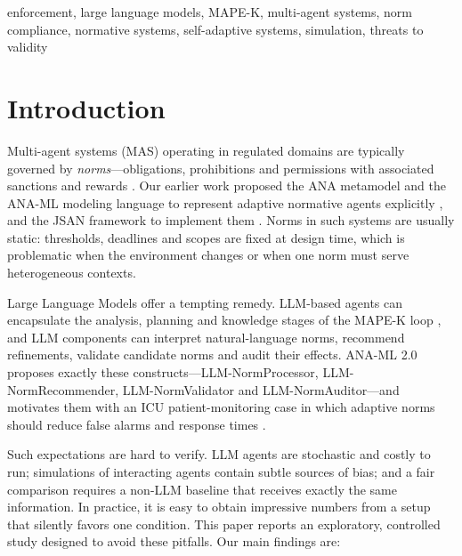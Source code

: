\documentclass{ieeeaccess}
\begin{document}
\begin{keywords}
enforcement, large language models, MAPE-K, multi-agent systems, norm compliance, normative systems, self-adaptive systems, simulation, threats to validity
\end{keywords}

\titlepgskip=-15pt

\maketitle

\section{Introduction}\label{sec:1}
Multi-agent systems (MAS) operating in regulated domains are typically governed by \emph{norms}—obligations, prohibitions and permissions with associated sanctions and rewards \cite{lopez2002constraining}. Our earlier work proposed the ANA metamodel and the ANA-ML modeling language to represent adaptive normative agents explicitly \cite{viana2022creating,viana2017modeling}, and the JSAN framework to implement them \cite{viana2015jsan}. Norms in such systems are usually static: thresholds, deadlines and scopes are fixed at design time, which is problematic when the environment changes or when one norm must serve heterogeneous contexts.

Large Language Models offer a tempting remedy. LLM-based agents can encapsulate the analysis, planning and knowledge stages of the MAPE-K loop \cite{nascimento2023selfadaptive,kephart2003vision}, and LLM components can interpret natural-language norms, recommend refinements, validate candidate norms and audit their effects. ANA-ML 2.0 proposes exactly these constructs—LLM-NormProcessor, LLM-NormRecommender, LLM-NormValidator and LLM-NormAuditor—and motivates them with an ICU patient-monitoring case in which adaptive norms should reduce false alarms and response times \cite{viana2025anaml2}.

Such expectations are hard to verify. LLM agents are stochastic and costly to run; simulations of interacting agents contain subtle sources of bias; and a fair comparison requires a non-LLM baseline that receives exactly the same information. In practice, it is easy to obtain impressive numbers from a setup that silently favors one condition. This paper reports an exploratory, controlled study designed to avoid these pitfalls. Our main findings are:
\end{document}
